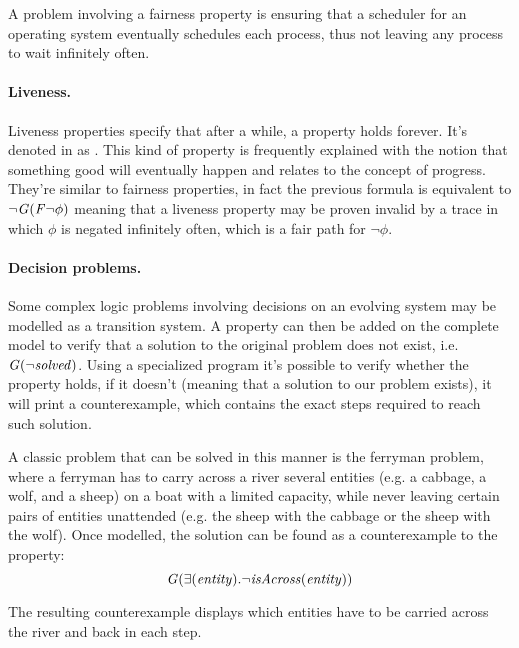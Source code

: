A problem involving a fairness property is ensuring that a scheduler for an operating system eventually schedules each process, thus not leaving any process to wait infinitely often.

\paragraph*{Liveness.} Liveness properties specify that after a while, a property holds forever. It's denoted in \ltl{} as \flive{}.
This kind of property is frequently explained with the notion that something good will eventually happen and relates to the concept of progress.
They're similar to fairness properties, in fact the previous formula is equivalent to $\lnot \mathit{G}(\mathit{F} \lnot \phi)$ meaning that a liveness property may be proven invalid by a trace in which $\phi$ is negated infinitely often, which is a fair path for $\lnot \phi$.

\paragraph*{Decision problems.} Some complex logic problems involving decisions on an evolving system may be modelled as a transition system.
A property can then be added on the complete model to verify that a solution to the original problem does not exist, i.e. $\mathit{G} (\lnot \mathit{solved})$.
Using a specialized program it's possible to verify whether the property holds, if it doesn't (meaning that a solution to our problem exists), it will print a counterexample, which contains the exact steps required to reach such solution.

A classic problem that can be solved in this manner is the ferryman problem, where a ferryman has to carry across a river several entities (e.g. a cabbage, a wolf, and a sheep) on a boat with a limited capacity, while never leaving certain pairs of entities unattended (e.g. the sheep with the cabbage or the sheep with the wolf).
Once modelled, the solution can be found as a counterexample to the property:
\[
    \mathit{G} (\exists (\mathit{entity}). \lnot \mathit{isAcross}(\mathit{entity}))
\]

The resulting counterexample displays which entities have to be carried across the river and back in each step.

